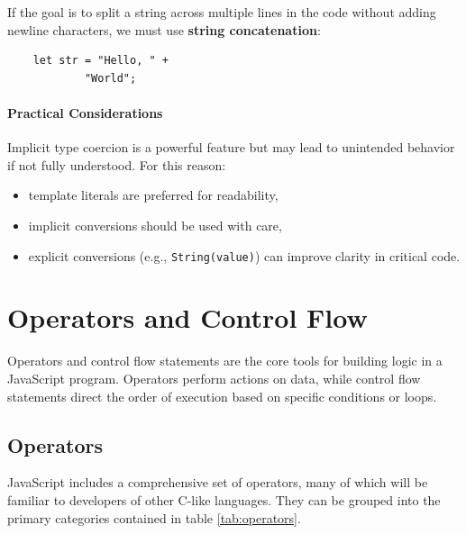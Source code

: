 \documentclass{scrbook}
\begin{document}
If the goal is to split a string across multiple lines in the code without adding newline characters, we must use \textbf{string concatenation}:

\begin{lstlisting}
    let str = "Hello, " +
            "World";
\end{lstlisting}

\subsubsection{Practical Considerations}

Implicit type coercion is a powerful feature but may lead to unintended behavior if not fully understood. For this reason:

\begin{itemize}
    \item template literals are preferred for readability,
    \item implicit conversions should be used with care,
    \item explicit conversions (e.g., \texttt{String(value)}) can improve clarity in critical code.
\end{itemize}

\chapter{Operators and Control Flow}

Operators and control flow statements are the core tools for building logic in a JavaScript program. Operators perform actions on data, while control flow statements direct the order of execution based on specific conditions or loops.

\section{Operators}

JavaScript includes a comprehensive set of operators, many of which will be familiar to developers of other C-like languages. They can be grouped into the primary categories contained in table \ref{tab:operators}.
\end{document}
